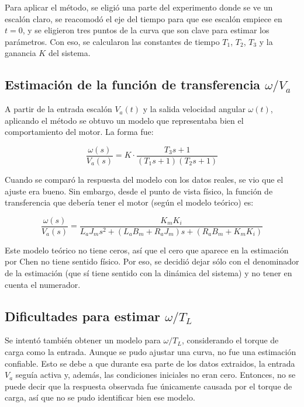 \documentclass{article}
\begin{document}
Para aplicar el método, se eligió una parte del experimento donde se ve un escalón claro, se reacomodó el eje del tiempo para que ese escalón empiece en $t = 0$, y se eligieron tres puntos de la curva que son clave para estimar los parámetros. Con eso, se calcularon las constantes de tiempo $T_1$, $T_2$, $T_3$ y la ganancia $K$ del sistema.

\subsection*{Estimación de la función de transferencia \texorpdfstring{$\omega/V_a$}{w/Va}}

A partir de la entrada escalón $V_a(t)$ y la salida velocidad angular $\omega(t)$, aplicando el método se obtuvo un modelo que representaba bien el comportamiento del motor. La forma fue:


\[
\frac{\omega(s)}{V_a(s)} = K \cdot \frac{T_3 s + 1}{(T_1 s + 1)(T_2 s + 1)}
\]

Cuando se comparó la respuesta del modelo con los datos reales, se vio que el ajuste era bueno. Sin embargo, desde el punto de vista físico, la función de transferencia que debería tener el motor (según el modelo teórico) es:

\begin{equation}
    \frac{\omega(s)}{V_a(s)} = \frac{K_m K_i}{L_a J_m s^2 + (L_a B_m + R_a J_m) s + (R_a B_m + K_m K_i)}
\end{equation}

Este modelo teórico no tiene ceros, así que el cero que aparece en la estimación por Chen no tiene sentido físico. Por eso, se decidió dejar sólo con el denominador de la estimación (que sí tiene sentido con la dinámica del sistema) y no tener en cuenta el numerador.

\subsection*{Dificultades para estimar \texorpdfstring{$\omega/T_L$}{w/TL}}

Se intentó también obtener un modelo para $\omega/T_L$, considerando el torque de carga como la entrada. Aunque se pudo ajustar una curva, no fue una estimación confiable. Esto se debe a que durante esa parte de los datos extraidos, la entrada $V_a$ seguía activa y, además, las condiciones iniciales no eran cero. Entonces, no se puede decir que la respuesta observada fue únicamente causada por el torque de carga, así que no se pudo identificar bien ese modelo.
\end{document}
